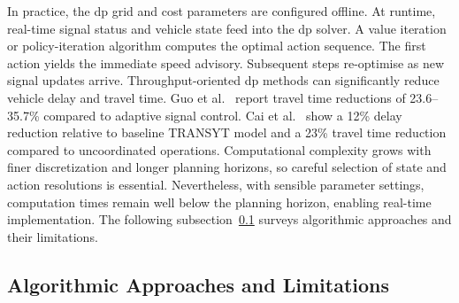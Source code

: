 In practice, the \ac{dp} grid and cost parameters are configured offline. At runtime, real-time signal status and vehicle state feed into the \ac{dp} solver. A value iteration or policy-iteration algorithm computes the optimal action sequence. The first action yields the immediate speed advisory. Subsequent steps re-optimise as new signal updates arrive.
\mynewline
Throughput-oriented \ac{dp} methods can significantly reduce vehicle delay and travel time. Guo et al.~\cite{Guo2019} report travel time reductions of 23.6–35.7\% compared to adaptive signal control. Cai et al.~\cite{Cai2008} show a 12\% delay reduction relative to baseline TRANSYT model and a 23\% travel time reduction compared to uncoordinated operations. Computational complexity grows with finer discretization and longer planning horizons, so careful selection of state and action resolutions is essential. Nevertheless, with sensible parameter settings, computation times remain well below the planning horizon, enabling real-time implementation. The following subsection~\ref{subsec:flow_dp_algorithms_limitations} surveys algorithmic approaches and their limitations.


\subsection{Algorithmic Approaches and Limitations}
\label{subsec:flow_dp_algorithms_limitations}

